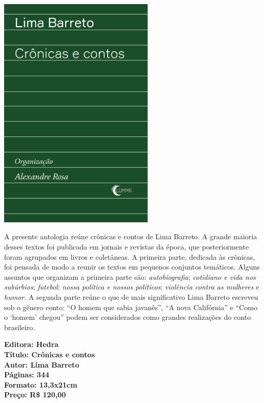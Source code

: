 \pagebreak

\begin{center}
\hspace*{-3.6cm}
\hspace*{3.1cm}\includegraphics[width=74mm]{./grid/barreto.png}
\end{center}

\hspace*{-7cm}\hrulefill\hspace*{-7cm}

\medskip

\noindent{}A presente antologia reúne crônicas e contos de Lima Barreto. A grande maioria desses textos foi publicada em jornais e revistas da época, que posteriormente foram agrupados em livros e coletâneas. A primeira parte, dedicada às crônicas, foi pensada de modo a reunir os textos em pequenos conjuntos temáticos. Alguns assuntos que organizam a primeira parte são: \textit{autobiografia}; \textit{cotidiano e vida nos subúrbios}; \textit{futebol}; \textit{nossa política e nossos políticos}; \textit{violência contra as mulheres} e \textit{humor}. A segunda parte reúne o que de mais significativo Lima Barreto escreveu sob o gênero conto: ``O homem que sabia javanês'', ``A nova Califórnia'' e ``Como o `homem' chegou'' podem ser considerados como grandes realizações do conto brasileiro.
\vfill

\noindent\begin{minipage}[c]{1\linewidth}
{\small\textbf{
\hspace*{-.1cm}Editora: Hedra\\
Título: Crônicas e contos\\
Autor: Lima Barreto\\ 
Páginas: 344\\
Formato: 13,3x21cm\\
Preço: R\$ 120,00\\
}}
\end{minipage}

